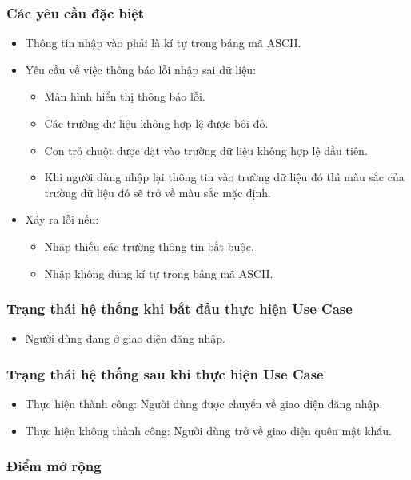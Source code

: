 \subsubsection{Các yêu cầu đặc biệt}
\begin{itemize}
    \item Thông tin nhập vào phải là kí tự trong bảng mã ASCII.
    \item Yêu cầu về việc thông báo lỗi nhập sai dữ liệu:
    \begin{itemize}
        \item Màn hình hiển thị thông báo lỗi.
        \item Các trường dữ liệu không hợp lệ được bôi đỏ.
        \item Con trỏ chuột được đặt vào trường dữ liệu không hợp lệ đầu tiên.
        \item Khi người dùng nhập lại thông tin vào trường dữ liệu đó thì màu sắc của trường dữ liệu đó sẽ trở về màu sắc mặc định.
    \end{itemize}
    \item Xảy ra lỗi nếu:
    \begin{itemize}
        \item Nhập thiếu các trường thông tin bắt buộc.
        \item Nhập không đúng kí tự trong bảng mã ASCII.
    \end{itemize}
\end{itemize}

\subsubsection{Trạng thái hệ thống khi bắt đầu thực hiện Use Case}
\begin{itemize}
    \item Người dùng đang ở giao diện đăng nhập.
\end{itemize}

\subsubsection{Trạng thái hệ thống sau khi thực hiện Use Case}
\begin{itemize}
    \item Thực hiện thành công: Người dùng được chuyển về giao diện đăng nhập.
    \item Thực hiện không thành công: Người dùng trở về giao diện quên mật khẩu.
\end{itemize}

\subsubsection{Điểm mở rộng}